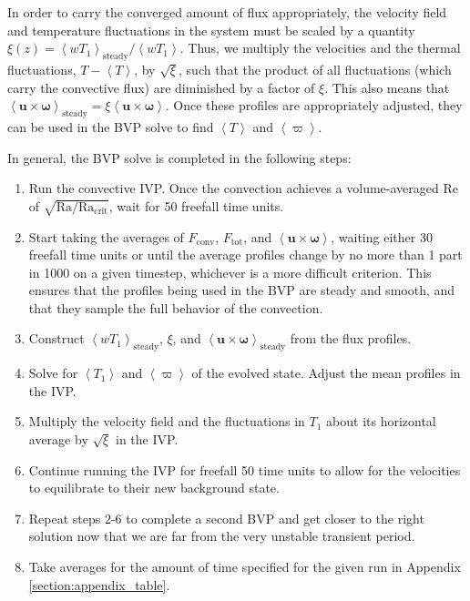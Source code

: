 \documentclass[aps, pre, onecolumn, nofootinbib, notitlepage, groupedaddress, amsfonts, amssymb, amsmath, longbibliography]{revtex4-1}
\newcommand{\angles}[1]{\ensuremath{\left\langle #1 \right\rangle}}
\begin{document}
In order to carry the converged amount of flux appropriately, 
the velocity field and temperature fluctuations in the system must be scaled by a quantity
$\xi(z) = \angles{w T_1}_{\text{steady}}/\angles{w T_1}$.  Thus, we multiply the velocities
and the thermal fluctuations, $T - \angles{T}$, by $\sqrt{\xi}$, such that the product of all fluctuations
(which carry the convective flux) are diminished by a factor of $\xi$.  This also means that
$\angles{\bm{u}\times\bm{\omega}}_{\text{steady}} = \xi \angles{\bm{u}\times\bm{\omega}}$. Once these profiles
are appropriately adjusted, they can be used in the BVP solve to find $\angles{T}$ and $\angles{\varpi}$.

In general, the BVP solve is completed in the following steps:
\begin{enumerate}
\item Run the convective IVP. Once the convection achieves a volume-averaged Re of $\sqrt{\text{Ra}/\text{Ra}_{\text{crit}}}$,
wait for 50 freefall time units.  
\item Start taking the averages of $F_{\text{conv}}$, $F_{\text{tot}}$, and $\angles{\bm{u} \times \bm{\omega}}$, waiting either
30 freefall time units or until the average profiles change by no more than 1 part in 1000 on a
given timestep, whichever is a more difficult criterion. This ensures that
the profiles being used in the BVP are steady and smooth, and that they sample the full behavior of the convection.
\item Construct $\angles{w T_1}_{\text{steady}}$, $\xi$, and $\angles{\bm{u}\times\bm{\omega}}_{\text{steady}}$
from the flux profiles.
\item Solve for $\angles{T_1}$ and \angles{\varpi} of the
evolved state.  Adjust the mean profiles in the IVP.
\item Multiply the velocity field and the fluctuations in $T_1$ about its horizontal average by $\sqrt{\xi}$ in the IVP. 
\item Continue running the IVP for freefall 50 time units to allow for the velocities to equilibrate to their new background state.
\item Repeat steps 2-6 to complete a second BVP and get closer to the right solution now that we
are far from the very unstable transient period.
\item Take averages for the amount of time specified for the given run in Appendix \ref{section:appendix_table}.
\end{enumerate}
\end{document}
